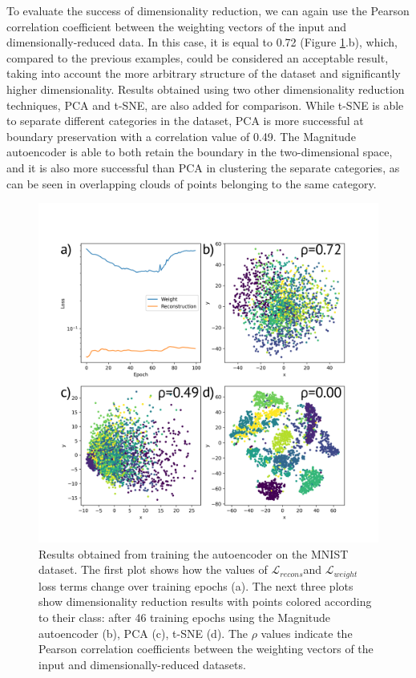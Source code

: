 \documentclass{article}
\begin{document}
To evaluate the success of dimensionality reduction, we can again use the Pearson correlation coefficient between the weighting vectors of the input and dimensionally-reduced data. In this case, it is equal to 0.72 (Figure \ref{fig:mnist}.b), which, compared to the previous examples, could be considered an acceptable result, taking into account the more arbitrary structure of the dataset and significantly higher dimensionality. Results obtained using two other dimensionality reduction techniques, PCA and t-SNE, are also added for comparison. While t-SNE is able to separate different categories in the dataset, PCA is more successful at boundary preservation with a correlation value of 0.49. The Magnitude autoencoder is able to both retain the boundary in the two-dimensional space, and it is also more successful than PCA in clustering the separate categories, as can be seen in overlapping clouds of points belonging to the same category.

\begin{figure}
  \includegraphics[width=\linewidth]{../figures/4_mnist/plot_wlabels.png}
  \caption{Results obtained from training the autoencoder on the MNIST dataset. The first plot shows how the values of $\mathcal{L}_{recons}$and $\mathcal{L}_{weight}$ loss terms change over training epochs (a). The next three plots show dimensionality reduction results with points colored according to their class: after 46 training epochs using the Magnitude autoencoder (b), PCA (c), t-SNE (d). The $\rho$ values indicate the Pearson correlation coefficients between the weighting vectors of the input and dimensionally-reduced datasets.}
  \label{fig:mnist}
\end{figure}
\end{document}
